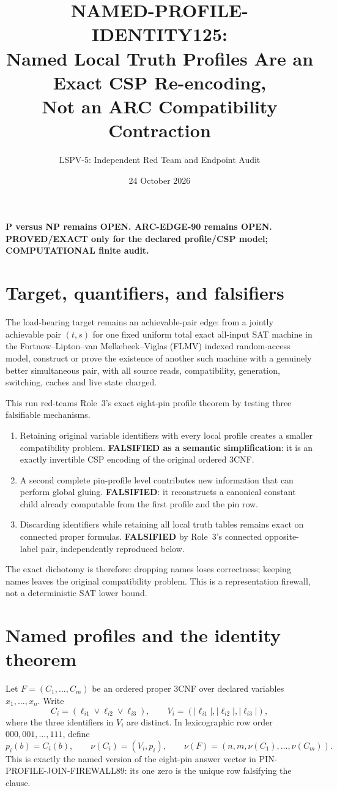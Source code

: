 \documentclass[11pt]{article}
\title{NAMED-PROFILE-IDENTITY125:\\
Named Local Truth Profiles Are an Exact CSP Re-encoding,\\
Not an ARC Compatibility Contraction}
\author{LSPV-5: Independent Red Team and Endpoint Audit}
\date{24 October 2026}
\begin{document}
\maketitle

\begin{center}
\textbf{P versus NP remains OPEN. ARC-EDGE-90 remains OPEN.}\\
\textbf{PROVED/EXACT only for the declared profile/CSP model; COMPUTATIONAL finite audit.}
\end{center}

\section{Target, quantifiers, and falsifiers}
The load-bearing target remains an achievable-pair edge: from a jointly
achievable pair $(t,s)$ for one fixed uniform total exact all-input SAT
machine in the Fortnow--Lipton--van Melkebeek--Viglas (FLMV) indexed
random-access model, construct or prove the existence of another such
machine with a genuinely better simultaneous pair, with all source reads,
compatibility, generation, switching, caches and live state charged.

This run red-teams Role~3's exact eight-pin profile theorem by testing three
falsifiable mechanisms.
\begin{enumerate}
\item Retaining original variable identifiers with every local profile
creates a smaller compatibility problem.  \textbf{FALSIFIED as a semantic
simplification}: it is an exactly invertible CSP encoding of the original
ordered 3CNF.
\item A second complete pin-profile level contributes new information that
can perform global gluing.  \textbf{FALSIFIED}: it reconstructs a canonical
constant child already computable from the first profile and the pin row.
\item Discarding identifiers while retaining all local truth tables remains
exact on connected proper formulas.  \textbf{FALSIFIED} by Role~3's
connected opposite-label pair, independently reproduced below.
\end{enumerate}
The exact dichotomy is therefore: dropping names loses correctness; keeping
names leaves the original compatibility problem.  This is a representation
firewall, not a deterministic SAT lower bound.

\section{Named profiles and the identity theorem}
Let $F=(C_1,\ldots,C_m)$ be an ordered proper 3CNF over declared variables
$x_1,\ldots,x_n$.  Write
\[
 C_i=(\ell_{i1}\vee\ell_{i2}\vee\ell_{i3}),\qquad
 V_i=(|\ell_{i1}|,|\ell_{i2}|,|\ell_{i3}|),
\]
where the three identifiers in $V_i$ are distinct.  In lexicographic row
order $000,001,\ldots,111$, define
\[
 p_i(b)=C_i(b),\qquad
 \nu(C_i)=(V_i,p_i),\qquad
 \nu(F)=(n,m,\nu(C_1),\ldots,\nu(C_m)).
\tag{1}
\]
This is exactly the named version of the eight-pin answer vector in
PIN-PROFILE-JOIN-FIREWALL89: its one zero is the unique row falsifying the
clause.
\end{document}
